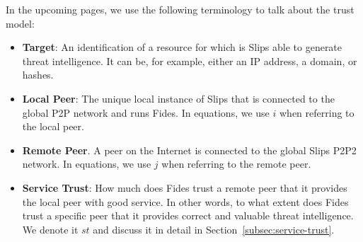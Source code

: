 \vspace{1cm}

\noindent
In the upcoming pages, we use the following terminology to talk about the trust model:

\begin{itemize}

\item \textbf{Target}: An identification of a resource for which is Slips able to generate threat intelligence. It can be, for example, either an IP address, a domain, or hashes.

\item \textbf{Local Peer}: The unique local instance of Slips that is connected to the global P2P network and runs Fides. In equations, we use $i$ when referring to the local peer.

\item \textbf{Remote Peer}. A peer on the Internet is connected to the global Slips P2P2 network. In equations, we use $j$ when referring to the remote peer.

\item \textbf{Service Trust}: How much does Fides trust a remote peer that it provides the local peer with good service. In other words, to what extent does Fides trust a specific peer that it provides correct and valuable threat intelligence. We denote it $st$ and discuss it in detail in Section~\ref{subsec:service-trust}.

\end{itemize}











